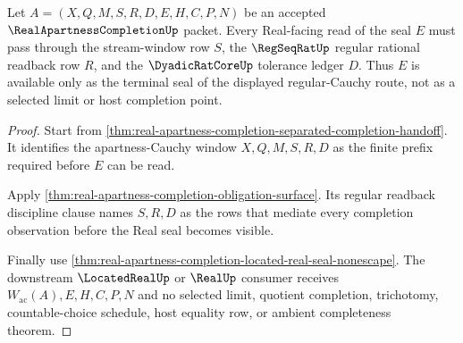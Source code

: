\begin{theorem}
\label{thm:real-apartness-completion-regular-readback-discipline}
Let $A=(X,Q,M,S,R,D,E,H,C,P,N)$ be an accepted $\RealApartnessCompletionUp$ packet. Every Real-facing read of the seal $E$ must pass through the stream-window row $S$, the $\RegSeqRatUp$ regular rational readback row $R$, and the $\DyadicRatCoreUp$ tolerance ledger $D$. Thus $E$ is available only as the terminal seal of the displayed regular-Cauchy route, not as a selected limit or host completion point.
\end{theorem}
\begin{proof}
Start from \autoref{thm:real-apartness-completion-separated-completion-handoff}. It identifies the apartness-Cauchy window $X,Q,M,S,R,D$ as the finite prefix required before $E$ can be read.

Apply \autoref{thm:real-apartness-completion-obligation-surface}. Its regular readback discipline clause names $S,R,D$ as the rows that mediate every completion observation before the Real seal becomes visible.

Finally use \autoref{thm:real-apartness-completion-located-real-seal-nonescape}. The downstream $\LocatedRealUp$ or $\RealUp$ consumer receives $W_{\mathrm{ac}}(A),E,H,C,P,N$ and no selected limit, quotient completion, trichotomy, countable-choice schedule, host equality row, or ambient completeness theorem.
\end{proof}

